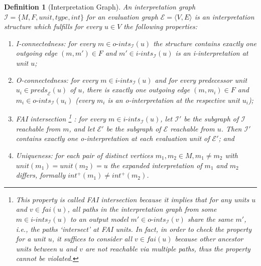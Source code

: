\documentclass[11pt,fleqn,twoside]{article}
\newtheorem{definition}{Definition}
\begin{document}
{			\begin{definition}[Interpretation Graph]
				\label{def:interpretationgraph}
				An \emph{interpretation graph} $\mathcal{I} = \{ M, F, \mathit{unit}, \mathit{type}, \mathit{int} \}$
				for an evaluation graph $\mathcal{E} = \langle V, E \rangle$
				is an interpretation structure which fulfills for every $u \in V$ the following properties:
				\begin{enumerate}
					\item[(IG-I)] \emph{I-connectedness:} for every $m \in \mathit{o\mbox{-}ints}_{\mathcal{I}}(u)$ the structure contains exactly one outgoing edge $(m, m') \in F$
									and $m' \in \mathit{i\mbox{-}ints}_{\mathcal{I}}(u)$ is an i-interpretation at unit $u$;
					\item[(IG-O)] \emph{O-connectedness:} for every $m \in \mathit{i\mbox{-}ints}_{\mathcal{I}}(u)$
									and for every predecessor unit $u_i \in \mathit{preds}_{\mathcal{E}}(u)$ of $u$,
									there is exactly one outgoing edge $(m, m_i) \in F$ and $m_i \in \mathit{o\mbox{-}ints}_{\mathcal{I}}(u_i)$
									(every $m_i$ is an o-interpretation at the respective unit $u_i$);
					\item[(IG-F)] \emph{FAI intersection}%
									\footnote{This property is called \emph{FAI intersection} because it implies that
									for any units $u$ and $v \in \mathit{fai}(u)$, all
									paths in the interpretation graph from some $m \in \mathit{i\mbox{-}ints}_{\mathcal{I}}(u)$
									to an output model $m' \in \mathit{o\mbox{-}ints}_{\mathcal{I}}(v)$
									share the same $m'$, i.e., the paths `intersect' at FAI units.
									In fact, in order to check the property for a unit $u$, it suffices to consider all $v \in \mathit{fai}(u)$
									because other ancestor units between $u$ and $v$ are not reachable via multiple paths,
									thus the property cannot be violated.}%
									\emph{:}
									for every $m \in \mathit{i\mbox{-}ints}_{\mathcal{I}}(u)$, let $\mathcal{I}'$ be the subgraph of $\mathcal{I}$ reachable
									from $m$, and let $\mathcal{E}'$ be the subgraph of $\mathcal{E}$ reachable from $u$. Then $\mathcal{I}'$ contains exactly one o-interpretation
									at each evaluation unit of $\mathcal{E}'$; and
					\item[(IG-U)] \emph{Uniqueness:} for each pair of distinct vertices $m_1, m_2 \in M, m_1 \not= m_2$ with $\mathit{unit}(m_1) = \mathit{unit}(m_2) = u$
								the expanded interpretation of $m_1$ and $m_2$ differs, formally $\mathit{int}^{+}(m_1) \not= \mathit{int}^{+}(m_2)$.
				\end{enumerate}
			\end{definition}

}
\end{document}
